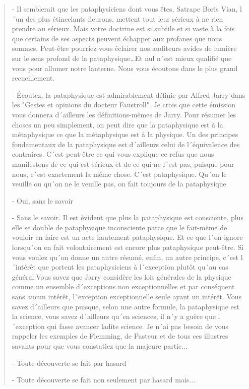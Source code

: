 {\small
\begin{quotation}
- Il semblerait que les pataphysiciens dont vous êtes, Satrape Boris Vian, l´un des plus étincelants fleurons, mettent tout leur sérieux à ne rien prendre au sérieux. Mais votre doctrine est si subtile et si vaste à la fois que certains de ses aspects peuvent échapper aux profanes que nous sommes. Peut-être pourriez-vous éclairer nos auditeurs avides de lumière sur le sens profond de la pataphysique\ldots Et nul n´est mieux qualifié que vous pour allumer notre lanterne. Nous vous écoutons dans le plus grand recueillement.

- Écoutez, la pataphysique est admirablement définie par Alfred Jarry dans les "Gestes et opinions du docteur Faustroll". Je crois que cette émission vous donnera d´ailleurs les définitions-mêmes de Jarry. Pour résumer les choses un peu simplement, on peut dire que la pataphysique est à la métaphysique ce que la métaphysique est à la physique. Un des principes fondamentaux de la pataphysique est d´ailleurs celui de l´équivalence des contraires. C´est peut-être ce qui vous explique ce refus que nous manifestons de ce qui est sérieux et de ce qui ne l´est pas, puisque pour nous, c´est exactement la même chose. C´est pataphysique. Qu´on le veuille ou qu´on ne le veuille pas, on fait toujours de la pataphysique

- Oui, sans le savoir

- Sans le savoir. Il est évident que plus la pataphysique est consciente, plus elle se double de pataphysique inconsciente parce que le fait-même de vouloir en faire est un acte hautement pataphysique. Et ce que l´on ignore lorsqu´on en fait volontairement est encore plus pataphysique peut-être. Si vous voulez qu´on donne un autre résumé, enfin, un autre principe, c´est l´intérêt que portent les pataphysiciens à l´exception plutôt qu´au cas général.Vous savez que Jarry considère les lois générales de la physique comme un ensemble d´exceptions non exceptionnelles et par conséquent sans aucun intérêt, l´exception exceptionnelle seule ayant un intérêt. Vous savez d´ailleurs que puisque, selon une autre formule, la pataphysique est la science, vous savez d´ailleurs qu´en sciences, il n´y a guère que l´exception qui fasse avancer ladite science. Je n´ai pas besoin de vous rappeler les exemples de Flemming, de Pasteur et de tous ces illustres savants pour que vous constatiez que la majeure partie...

- Toute découverte se fait par hasard

- Toute découverte se fait non seulement par hasard mais...


\end{quotation}}
